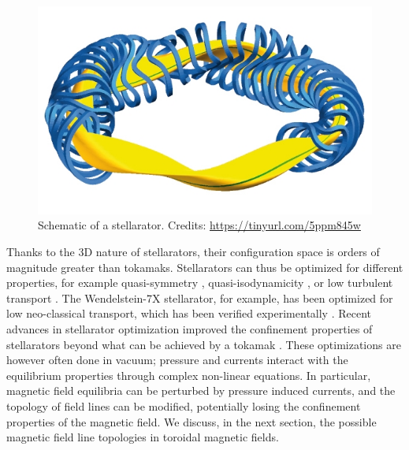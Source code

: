 \documentclass[my_thesis.tex]{subfiles}
\begin{document}
\begin{figure}
    \centering
    \includegraphics[width=\linewidth]{images/Introduction/StellaratorSketch.jpg}
    \caption{Schematic of a stellarator. Credits: \url{https://tinyurl.com/5ppm845w}}
    \label{fig stellarator sketch}
\end{figure}

Thanks to the 3D nature of stellarators, their configuration space is orders of magnitude greater than tokamaks. Stellarators can thus be optimized for different properties, for example quasi-symmetry \citep{Landreman2022}, quasi-isodynamicity \citep{goodmanConstructingPreciselyQuasiisodynamic2022a},  or low turbulent transport \citep{xanthopoulosControllingTurbulencePresent2014}. The Wendelstein-7X stellarator, for example, has been optimized for low neo-classical transport, which has been verified experimentally \citep{beidlerDemonstrationReducedNeoclassical2021}. Recent advances in stellarator optimization improved the confinement properties of stellarators beyond what can be achieved by a tokamak \citep{landremanOptimizationQuasisymmetricStellarators2022}. These optimizations are however often done in vacuum; pressure and currents interact with the equilibrium properties through complex non-linear equations. In particular, magnetic field equilibria can be perturbed by pressure induced currents, and the topology of field lines can be modified, potentially losing the confinement properties of the magnetic field. We discuss, in the next section, the possible magnetic field line topologies in toroidal magnetic fields.
\end{document}
